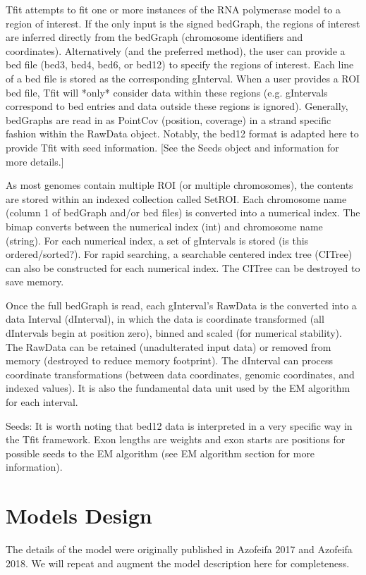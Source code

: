\documentclass[11pt]{article}
\begin{document}
Tfit attempts to fit one or more instances of the RNA polymerase model to a 
region of interest.  If the only input is the signed bedGraph, the regions of 
interest are inferred directly from the bedGraph (chromosome identifiers 
and coordinates).  Alternatively (and the preferred method), the user can 
provide a bed file (bed3, bed4, bed6, or bed12) to specify the regions of 
interest.  Each line of a bed file is stored as the corresponding gInterval.
When a user provides a ROI bed file, Tfit will *only* consider data within 
these regions (e.g. gIntervals correspond to bed entries and data outside these 
regions is ignored).  Generally, bedGraphs are read in as PointCov (position, 
coverage) in a strand specific fashion within the RawData object.  Notably,
the bed12 format is adapted here to provide Tfit with seed information.  [See
the Seeds object and information for more details.]

As most genomes contain multiple ROI (or multiple chromosomes), the contents
are stored within an indexed collection called SetROI.  Each chromosome name 
(column 1 of bedGraph and/or bed files) is converted into a numerical index.
The bimap converts between the numerical index (int) and chromosome name (string).
For each numerical index, a set of gIntervals is stored (is this ordered/sorted?). 
For rapid searching, a searchable centered index tree (CITree) can also be 
constructed for each numerical index.  The CITree can be destroyed to save 
memory.  

Once the full bedGraph is read, each gInterval's RawData is the converted into
a data Interval (dInterval), in which the data is coordinate transformed (all
dIntervals begin at position zero), binned and scaled (for numerical
stability).  The RawData can be retained (unadulterated input data) or removed 
from memory (destroyed to reduce memory footprint).  The dInterval can 
process coordinate transformations (between data coordinates, genomic 
coordinates, and indexed values).  It is also the fundamental data unit 
used by the EM algorithm for each interval.

Seeds: It is worth noting that bed12 data is interpreted in a very specific way
in the Tfit framework.   Exon lengths are weights and exon starts are 
positions for possible seeds to the EM algorithm (see EM algorithm 
section for more information).

\clearpage
\section{Models Design}
The details of the model were originally published in Azofeifa 2017 and
Azofeifa 2018.  We will repeat and augment the model description here for
completeness.  
\end{document}
